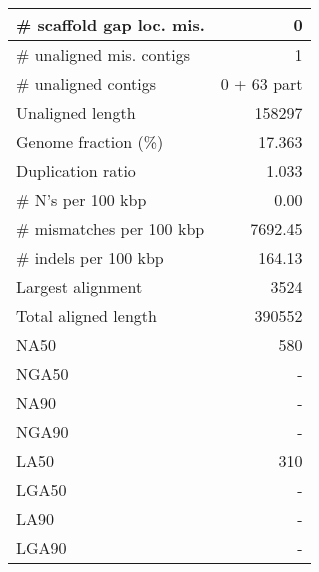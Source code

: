 \documentclass[12pt,a4paper]{article}
\begin{document}
\begin{table}[ht]
\begin{center}
\begin{tabular}{|l*{1}{|r}|}
\# scaffold gap loc. mis. & 0 \\ \hline
\# unaligned mis. contigs & 1 \\ \hline
\# unaligned contigs & 0 + 63 part \\ \hline
Unaligned length & 158297 \\ \hline
Genome fraction (\%) & 17.363 \\ \hline
Duplication ratio & 1.033 \\ \hline
\# N's per 100 kbp & 0.00 \\ \hline
\# mismatches per 100 kbp & 7692.45 \\ \hline
\# indels per 100 kbp & 164.13 \\ \hline
Largest alignment & 3524 \\ \hline
Total aligned length & 390552 \\ \hline
NA50 & 580 \\ \hline
NGA50 & - \\ \hline
NA90 & - \\ \hline
NGA90 & - \\ \hline
LA50 & 310 \\ \hline
LGA50 & - \\ \hline
LA90 & - \\ \hline
LGA90 & - \\ \hline
\end{tabular}
\end{center}
\end{table}
\end{document}
